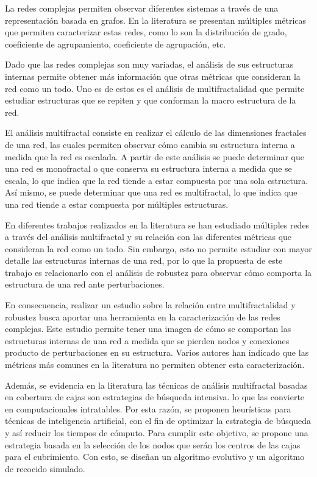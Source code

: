 La redes complejas permiten observar diferentes sistemas a través de una representación basada en grafos. En la literatura se presentan múltiples métricas que permiten caracterizar estas redes, como lo son la distribución de grado, coeficiente de agrupamiento, coeficiente de agrupación, etc. 

Dado que las redes complejas son muy variadas, el análisis de sus estructuras internas permite obtener más información que otras métricas que consideran la red como un todo. Uno es de estos es el análisis de multifractalidad que permite estudiar estructuras que se repiten y que conforman la macro estructura de la red.

El análisis multifractal consiste en realizar el cálculo de las dimensiones fractales de una red, las cuales permiten observar cómo cambia su estructura interna a medida que la red es escalada. A partir de este análisis se puede determinar que una red es monofractal o que conserva su estructura interna a medida que se escala, lo que indica que la red tiende a estar compuesta por una sola estructura. Así mismo, se puede determinar que una red es multifractal, lo que indica que una red tiende a estar compuesta por múltiples estructuras.

En diferentes trabajos realizados en la literatura se han estudiado múltiples redes a través del análisis multifractal y su relación con las diferentes métricas que consideran la red como un todo. Sin embargo, esto no permite estudiar con mayor detalle las estructuras internas de una red, por lo que la propuesta de este trabajo es relacionarlo con el análisis de robustez para observar cómo comporta la estructura de una red ante perturbaciones. 

En consecuencia, realizar un estudio sobre la relación entre multifractalidad y robustez busca aportar una herramienta en la caracterización de las redes complejas. Este estudio permite tener una imagen de cómo se comportan las estructuras internas de una red a medida que se pierden nodos y conexiones producto de perturbaciones en su estructura. Varios autores han indicado que las métricas más comunes en la literatura no permiten obtener esta caracterización.

Además, se evidencia en la literatura las técnicas de análisis multifractal basadas en cobertura de cajas son estrategias de búsqueda intensiva. lo que las convierte en computacionales intratables. Por esta razón, se proponen heurísticas para técnicas de inteligencia artificial, con el fin de optimizar la estrategia de búsqueda y así reducir los tiempos de cómputo. Para cumplir este objetivo, se propone una estrategia basada en la selección de los nodos que serán los centros de las cajas para el cubrimiento. Con esto, se diseñan un algoritmo evolutivo y un algoritmo de recocido simulado.

